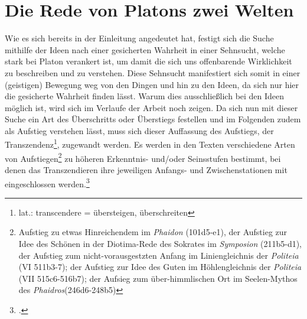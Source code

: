 
\section{Die Rede von Platons zwei Welten}

Wie es sich bereits in der Einleitung angedeutet hat, festigt sich die Suche mithilfe der Ideen nach einer gesicherten Wahrheit in einer Sehnsucht, welche stark bei Platon verankert ist, um damit die sich uns offenbarende Wirklichkeit zu beschreiben und zu verstehen. Diese Sehnsucht manifestiert sich somit in einer (geistigen) Bewegung weg von den Dingen und hin zu den Ideen, da sich nur hier die gesicherte Wahrheit finden lässt. Warum dies ausschließlich bei den Ideen möglich ist, wird sich im Verlaufe der Arbeit noch zeigen. Da sich nun mit dieser Suche ein Art des Überschritts oder Überstiegs festellen und  im Folgenden zudem als Aufstieg verstehen lässt, muss sich dieser Auffassung des Aufstiegs, der Transzendenz\footnote{lat.: transcendere = übersteigen, überschreiten}, zugewandt werden.
Es werden in den Texten verschiedene Arten von Aufstiegen\footnote{Aufstieg zu etwas Hinreichendem im \emph{Phaidon} (101d5-e1), der Aufstieg zur Idee des Schönen in der Diotima-Rede des Sokrates im \emph{Symposion} (211b5-d1), der Aufstieg zum nicht-vorausgestzten Anfang im Liniengleichnis der \emph{Politeia} (VI 511b3-7); der Aufstieg zur Idee des Guten im Höhlengleichnis der \emph{Politeia} (VII 515c6-516b7); der Aufsieg zum über-himmlischen Ort im Seelen-Mythos des \emph{Phaidros}(246d6-248b5)} zu höheren Erkenntnis- und/oder Seinsstufen bestimmt, bei denen das Transzendieren ihre jeweiligen Anfangs- und Zwischenstationen mit eingeschlossen werden.\footcite[vgl.][S. 347]{StrobelTranszendenz}
